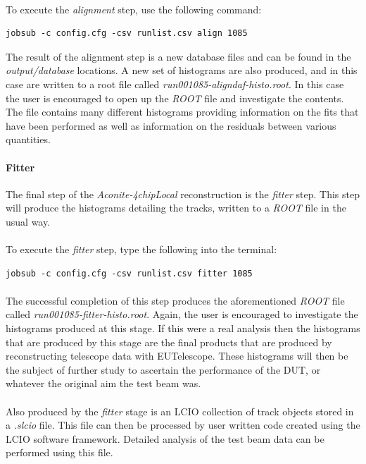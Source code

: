 \documentclass[11pt]{article}
\begin{document}
\paragraph{}
To execute the \textit{alignment} step, use the following command:
\begin{verbatim}
jobsub -c config.cfg -csv runlist.csv align 1085
\end{verbatim}
The result of the alignment step is a new database files and can be found in the \textit{output/database} locations. A new set of histograms are also produced, and in this case are written to a root file called \textit{run001085-aligndaf-histo.root}. In this case the user is encouraged to open up the \textit{ROOT} file and investigate the contents. The file contains many different histograms providing information on the fits that have been performed as well as information on the residuals between various quantities.
\paragraph{Fitter}
The final step of the \textit{Aconite-4chipLocal} reconstruction is the \textit{fitter} step. This step will produce the histograms detailing the tracks, written to a \textit{ROOT} file in the usual way.
\paragraph{}
To execute the \textit{fitter} step, type the following into the terminal:
\begin{verbatim}
jobsub -c config.cfg -csv runlist.csv fitter 1085
\end{verbatim}
\paragraph{}
The successful completion of this step produces the aforementioned \textit{ROOT} file called \textit{run001085-fitter-histo.root}. Again, the user is encouraged to investigate the histograms produced at this stage. If this were a real analysis then the histograms that are produced by this stage are the final products that are produced by reconstructing telescope data with EUTelescope. These histograms will then be the subject of further study to ascertain the performance of the DUT, or whatever the original aim the test beam was.
\paragraph{}
Also produced by the \textit{fitter} stage is an LCIO collection of track objects stored in a \textit{.slcio} file. This file can then be processed by user written code created using the LCIO software framework. Detailed analysis of the test beam data can be performed using this file.
\end{document}
